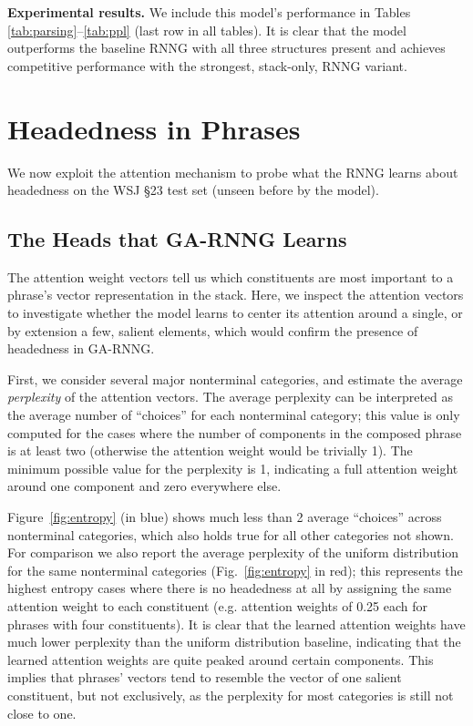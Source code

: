 \documentclass[11pt]{article}
\newcommand{\cjd}[1]{\textcolor{cyan}{{\textbf{[#1 --\textsc{cjd}]}}}}
\newcommand{\nascomment}[1]{\textcolor{blue}{{\textbf{[#1 --\textsc{nas}]}}}}
\renewcommand{\cjd}[1]{}
\renewcommand{\nascomment}[1]{}
\begin{document}
\textbf{Experimental results.} We include this model's performance in Tables \ref{tab:parsing}--\ref{tab:ppl} (last row in all tables). It is clear that the model outperforms the baseline RNNG with all three structures present and achieves competitive performance with the strongest, stack-only, RNNG variant.


\section{Headedness in Phrases}\label{sec:headedness}
We now exploit the attention mechanism to probe what the RNNG learns about headedness on the WSJ \S 23 test set (unseen before by the model).
\subsection{The Heads that GA-RNNG Learns}\label{sec:heads_GA_RNNG}

\nascomment{need to figure out -- perplexity or entropy?}\cjd{strongly in favor of ppl}

The attention weight vectors tell us which constituents are most important to a phrase's vector representation in the stack.  Here, we inspect the attention vectors to investigate whether the model learns to center its attention around a single, or by extension a few, salient elements, which would confirm the presence of headedness in GA-RNNG.

First, we consider several major nonterminal categories, and estimate the average \emph{perplexity} of the attention vectors. The average perplexity can be interpreted as the average number of ``choices'' for each nonterminal category; this value is only computed for the cases where the number of components in the composed phrase is at least two (otherwise the attention weight would be trivially 1). The minimum possible value for the perplexity is 1, indicating a full attention weight around one component and zero everywhere else. 

Figure~\ref{fig:entropy} (in blue) shows much less than 2 average ``choices'' across nonterminal categories, which also holds true for all other categories not shown. For comparison we also report the average perplexity of the uniform distribution for the same nonterminal categories (Fig.~\ref{fig:entropy} in red); this represents the highest entropy cases where there is no headedness at all by assigning the same attention weight to each constituent (e.g. attention weights of 0.25 each for phrases with four constituents). It is clear that the learned attention weights have much lower perplexity than the uniform distribution baseline, indicating that the learned attention weights are quite peaked around certain components. This implies that phrases' vectors tend to resemble the vector of one salient constituent, but not exclusively, as the perplexity for most categories is still not close to one. 
\end{document}
